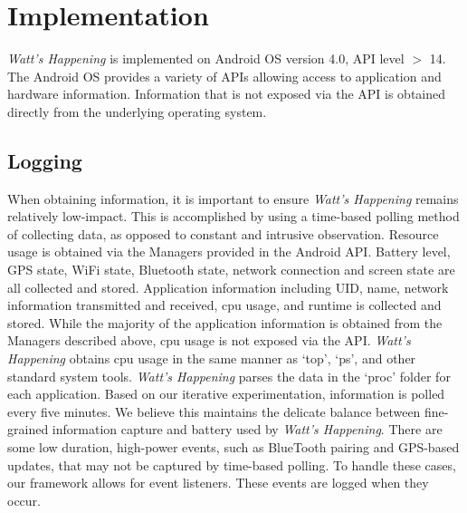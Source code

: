 \section*{Implementation}
\label{sec:implementation}
\emph{Watt's Happening} is implemented on Android OS version 4.0, API level $>$ 14. 
The Android OS provides a variety of APIs allowing access to application and hardware information.
Information that is not exposed via the API is obtained directly from the underlying operating system.

\subsection*{Logging}
When obtaining information, it is important to ensure \emph{Watt's Happening} remains relatively low-impact.
This is accomplished by using a time-based polling method of collecting data, as opposed to constant and intrusive observation.
Resource usage is obtained via the Managers provided in the Android API.
Battery level, GPS state, WiFi state, Bluetooth state, network connection and screen state are all collected and stored.
Application information including UID, name, network information transmitted and received, cpu usage, and runtime is collected and stored. 
While the majority of the application information is obtained from the Managers described above, cpu usage is not exposed via the API.
\emph{Watt's Happening} obtains cpu usage in the same manner as `top', `ps', and other standard system tools.
\emph{Watt's Happening} parses the data in the `proc' folder for each application.
Based on our iterative experimentation, information is polled every five minutes.
We believe this maintains the delicate balance between fine-grained information capture and battery used by \emph{Watt's Happening}.
There are some low duration, high-power events, such as BlueTooth pairing and GPS-based updates, that may not be captured by time-based polling.
To handle these cases, our framework allows for event listeners.
These events are logged when they occur. 

